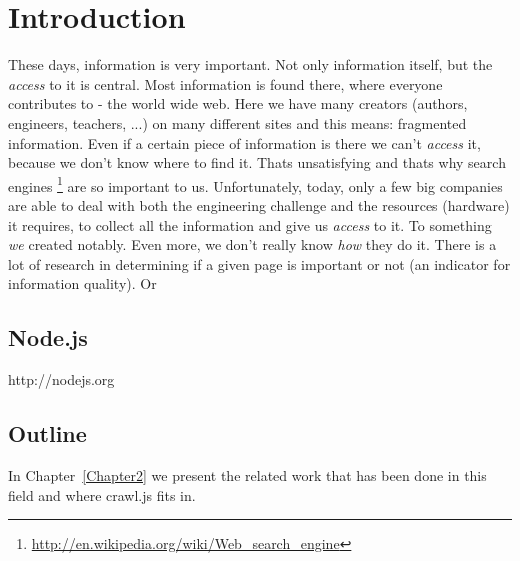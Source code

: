 
\chapter{Introduction} %

\label{Chapter1} %


These days, information is very important. Not only information itself, but the \emph{access} to it is central. Most information is found there, where everyone contributes to - the world wide web. Here we have many creators (authors, engineers, teachers, ...) on many different sites and this means: fragmented information. Even if a certain piece of information is there we can't \emph{access} it, because we don't know where to find it. Thats unsatisfying and thats why search engines \footnote{\url{http://en.wikipedia.org/wiki/Web_search_engine}} are so important to us.
\newline
Unfortunately, today, only a few big companies are able to deal with both the engineering challenge and the resources (hardware) it requires, to collect all the information and give us \emph{access} to it. To something \emph{we} created notably. Even more, we don't really know \emph{how} they do it. There is a lot of research in determining if a given page is important or not\cite{page_importance1}\cite{page_importance2} (an indicator for information quality). Or  


\section{Node.js}

http://nodejs.org

\section{Outline}
In Chapter~\ref{Chapter2} we present the related work that has been done in this field and where crawl.js fits in.

